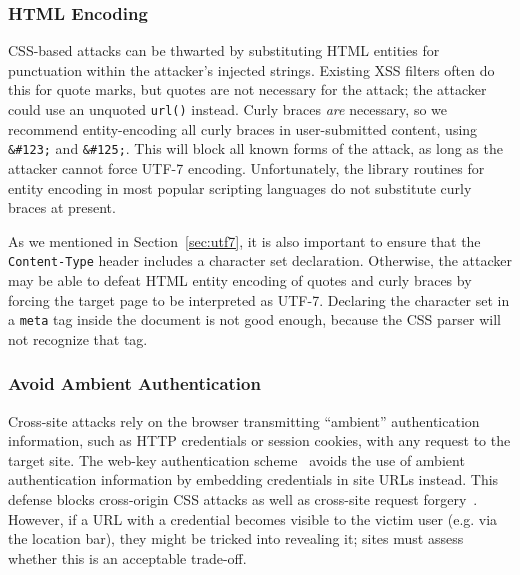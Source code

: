 \documentclass{sig-alternate}
\begin{document}
\subsubsection{HTML Encoding}
CSS-based attacks can be thwarted by substituting HTML entities for
punctuation within the attacker's injected strings.  Existing XSS
filters often do this for quote marks, but quotes are not necessary
for the attack; the attacker could use an unquoted \texttt{url()}
instead.  Curly braces \emph{are} necessary, so we recommend
entity-encoding all curly braces in user-submitted content, using
\verb|&#123;| and \verb|&#125;|. This will block all known forms of
the attack, as long as the attacker cannot force UTF-7 encoding.
Unfortunately, the library routines for entity encoding in most
popular scripting languages do not substitute curly braces at present.

As we mentioned in Section~\ref{sec:utf7}, it is also important
to ensure that the \texttt{Content-Type} header includes a
character set declaration. Otherwise, the attacker may be able
to defeat HTML entity encoding of quotes and curly braces by
forcing the target page to be interpreted as UTF-7. Declaring
the character set in a \texttt{meta} tag inside the document is
not good enough, because the CSS parser will not recognize that
tag.


\subsubsection{Avoid Ambient Authentication}
Cross-site attacks rely on the browser transmitting ``ambient''
authentication information, such as HTTP credentials or session
cookies, with any request to the target site.  
The web-key authentication scheme~\cite{webkey} avoids the use of ambient
authentication information by embedding credentials
in site URLs instead.  This defense blocks cross-origin CSS attacks
as well as cross-site request forgery~\cite{csrf}.
However, if a URL with a credential becomes
visible to the victim user (e.g. via the location bar), they might be
tricked into revealing it; sites must assess whether this is an
acceptable trade-off.

\end{document}
